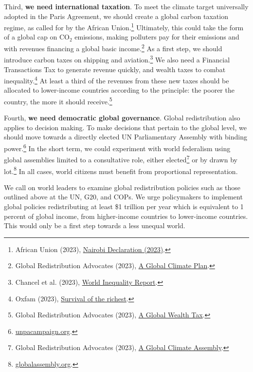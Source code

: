 \documentclass[a5paper,english,openany]{memoir}
\begin{document}
Third, \textbf{we need international taxation}. To meet the climate target universally adopted in the Paris Agreement, we should create a global carbon taxation regime, as called for by the African Union.\footnote{African Union (2023), \href{https://media.africaclimatesummit.org/NAIROBI+Declaration+FURTHER+edited+060923+EN+920AM.pdf}{Nairobi Declaration (2023)}.} 
Ultimately, this could take the form of a global cap on CO$_\text{2}$ emissions, making polluters pay for their emissions and with revenues financing a global basic income.\footnote{Global Redistribution Advocates (2023), \href{https://github.com/bixiou/global\_tax\_attitudes/raw/main/paper/policy\_brief\_GCS.pdf}{A Global Climate Plan}.} 
As a first step, we should introduce carbon taxes on shipping and aviation.\footnote{Chancel et al. (2023), \href{https://wid.world/wp-content/uploads/2023/01/CBV2023-ClimateInequalityReport-3.pdf}{World Inequality Report}.} 
We also need a Financial Transactions Tax to generate revenue quickly, and wealth taxes to combat inequality.\footnote{Oxfam (2023), \href{https://oxfamilibrary.openrepository.com/bitstream/handle/10546/621477/mn-survival-of-the-richest-methodology-160123-en.pdf}{Survival of the richest}.} 
At least a third of the revenues from these new taxes should be allocated to lower-income countries according to the principle: the poorer the country, the more it should receive.\footnote{Global Redistribution Advocates (2023), \href{https://github.com/bixiou/global\_tax\_attitudes/raw/main/paper/policy\_brief\_tax.pdf}{A Global Wealth Tax}.}

Fourth, \textbf{we need democratic global governance}. Global redistribution also applies to decision making. %
To make decisions that pertain to the global level, we should move towards a directly elected UN Parliamentary Assembly with binding power.\footnote{\href{https://www.unpacampaign.org/}{unpacampaign.org}.} In the short term, we could experiment with world federalism using global assemblies limited to a consultative role, either elected\footnote{Global Redistribution Advocates (2023), \href{https://github.com/bixiou/global\_tax\_attitudes/raw/main/paper/policy\_brief\_assembly.pdf}{A Global Climate Assembly}.} 
or by drawn by lot.\footnote{\href{https://globalassembly.org/}{globalassembly.org}.} In all cases, world citizens must benefit from proportional representation.

We call on world leaders to examine global redistribution policies such as those outlined above at the UN, G20, and COPs. We urge policymakers to implement global policies redistributing at least \$1 trillion per year which is equivalent to 1 percent of global income, %
from higher-income countries to lower-income countries. This would only be a first step towards a less unequal world.
\end{document}

